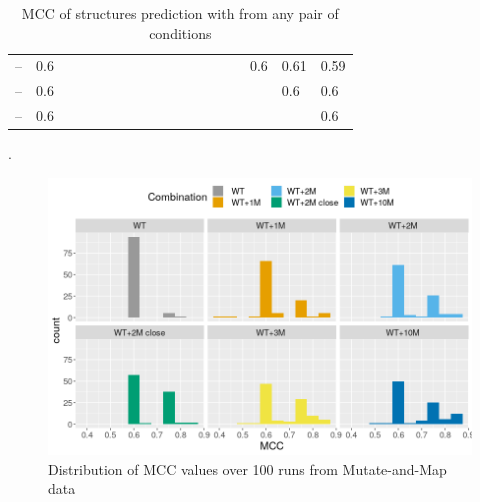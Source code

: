 \documentclass[11pt]{article} %
\begin{document}
\begin{table}[H]
\begin{adjustbox}{max width=\textwidth,max totalheight=\textheight,keepaspectratio}
\begin{tabular}{lHHHHHHHHHHHHHHHHH}
	 -- \OneMSevCE        & 0.6                      &        &        &        &        &        &        &        &        &        &         &         &         &         & 0.6     & 0.61    & 0.59    \\
	 -- \BzCN             & 0.6                      &        &        &        &        &        &        &        &        &        &         &         &         &         &         & 0.6     & 0.6     \\
	 -- \NAICE            & 0.6                      &        &        &        &        &        &        &        &        &        &         &         &         &         &         &         & 0.6     \\ \bottomrule
\end{tabular}
\end{adjustbox}
\caption{MCC of structures prediction with \OurTool{} from any pair of conditions}.
\end{table}


%

\begin{figure}[H]
\includegraphics[width=\linewidth]{graphs/histog1}
\caption{Distribution of MCC values over 100 runs from Mutate-and-Map data}
\end{figure}


%


\end{document}
